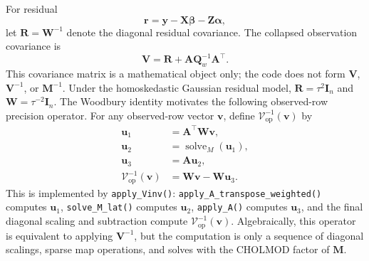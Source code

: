 \documentclass[11pt]{article}
\newcommand{\by}{\bm{y}}
\newcommand{\balpha}{\bm{\alpha}}
\newcommand{\bbeta}{\bm{\beta}}
\newcommand{\br}{\bm{r}}
\newcommand{\bu}{\bm{u}}
\newcommand{\bv}{\bm{v}}
\newcommand{\bA}{\bm{A}}
\newcommand{\bI}{\bm{I}}
\newcommand{\bM}{\bm{M}}
\newcommand{\bQ}{\bm{Q}}
\newcommand{\bR}{\bm{R}}
\newcommand{\bV}{\bm{V}}
\newcommand{\bW}{\bm{W}}
\newcommand{\bX}{\bm{X}}
\newcommand{\bZ}{\bm{Z}}
\newcommand{\trans}{^\top}
\begin{document}
For residual
\begin{equation}
  \br = \by - \bX\bbeta - \bZ\balpha,
\end{equation}
let $\bR=\bW^{-1}$ denote the diagonal residual covariance. The collapsed observation covariance is
\begin{equation}
  \label{eq:V-cov}
  \bV = \bR + \bA \bQ_w^{-1} \bA\trans.
\end{equation}
This covariance matrix is a mathematical object only; the code does not form $\bV$, $\bV^{-1}$, or $\bM^{-1}$. Under the homoskedastic Gaussian residual model, $\bR=\tau^2\bI_n$ and $\bW=\tau^{-2}\bI_n$. The Woodbury identity motivates the following observed-row precision operator. For any observed-row vector $\bv$, define $\mathcal{V}^{-1}_{\mathrm{op}}(\bv)$ by
\begin{equation}
\label{eq:Vinv-op}
\begin{aligned}
  \bu_1 &= \bA\trans \bW\bv,\\
  \bu_2 &= \operatorname{solve}_M(\bu_1),\\
  \bu_3 &= \bA\bu_2,\\
  \mathcal{V}^{-1}_{\mathrm{op}}(\bv) &= \bW\bv - \bW\bu_3 .
\end{aligned}
\end{equation}
This is implemented by \texttt{apply\_Vinv()}: \texttt{apply\_A\_transpose\_weighted()} computes $\bu_1$, \texttt{solve\_M\_lat()} computes $\bu_2$, \texttt{apply\_A()} computes $\bu_3$, and the final diagonal scaling and subtraction compute $\mathcal{V}^{-1}_{\mathrm{op}}(\bv)$. Algebraically, this operator is equivalent to applying $\bV^{-1}$, but the computation is only a sequence of diagonal scalings, sparse map operations, and solves with the CHOLMOD factor of $\bM$.
\end{document}
